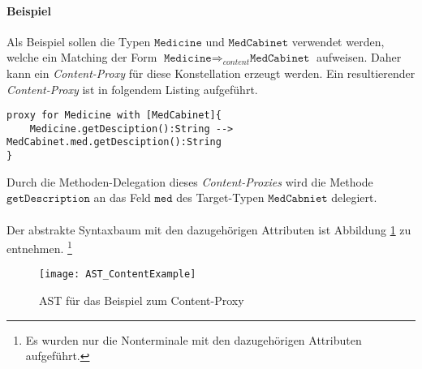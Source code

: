 \paragraph{Beispiel} Als Beispiel sollen die Typen $\texttt{Medicine}$ und $\texttt{MedCabinet}$ verwendet werden, welche ein Matching der Form $\texttt{Medicine} \Rightarrow_{content} \texttt{MedCabinet}$ aufweisen. Daher kann ein \emph{Content-Proxy} für diese Konstellation erzeugt werden. Ein resultierender \emph{Content-Proxy} ist in folgendem Listing aufgeführt.
\begin{lstlisting}[style = dsl, caption = Content-Proxy für Medicine, captionpos = b]
proxy for Medicine with [MedCabinet]{
	Medicine.getDesciption():String --> MedCabinet.med.getDesciption():String
}
\end{lstlisting}
Durch die Methoden-Delegation dieses \emph{Content-Proxies} wird die Methode $\texttt{getDescription}$ an das Feld $\texttt{med}$ des Target-Typen $\texttt{MedCabniet}$ delegiert.\\\\
Der abstrakte Syntaxbaum mit den dazugehörigen Attributen ist Abbildung \ref{fig:ASTCONTENT} zu entnehmen. \footnote{Es wurden nur die Nonterminale mit den dazugehörigen Attributen aufgeführt.}
\begin{figure}[h!]
\centering
\texttt{[image: AST\_ContentExample]}
\caption{AST für das Beispiel zum Content-Proxy}
\label{fig:ASTCONTENT}
\end{figure}
\noindent
